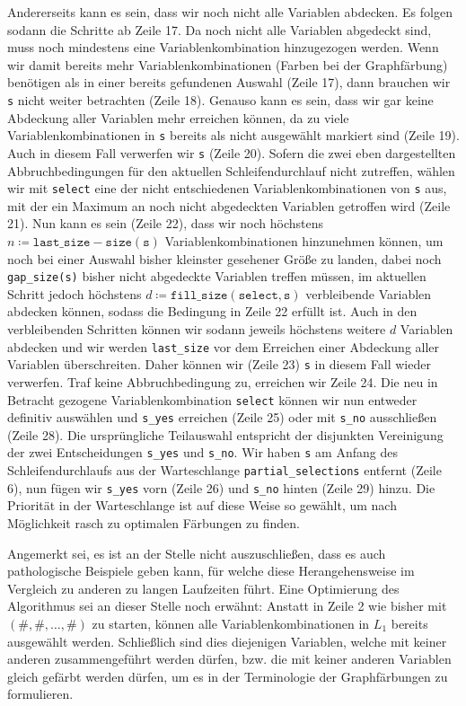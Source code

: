 \documentclass[a4paper]{article}
\theoremstyle{nonumberplain}
\begin{document}
Andererseits kann es sein, dass wir noch nicht alle Variablen abdecken. Es folgen sodann die Schritte ab Zeile 17. Da noch nicht alle Variablen abgedeckt sind, muss noch mindestens eine Variablenkombination hinzugezogen werden. Wenn wir damit bereits mehr Variablenkombinationen (Farben bei der Graph\-fär\-bung) benötigen als in einer bereits gefundenen Auswahl (Zeile 17), dann brauchen wir \texttt{s} nicht weiter betrachten (Zeile 18). Genauso kann es sein, dass wir gar keine Abdeckung aller Variablen mehr erreichen können, da zu viele Variablenkombinationen in \texttt{s} bereits als nicht ausgewählt markiert sind (Zeile 19). Auch in diesem Fall verwerfen wir \texttt{s} (Zeile 20).
Sofern die zwei eben dargestellten Abbruchbedingungen für den aktuellen Schleifendurchlauf nicht zutreffen, wählen wir mit \texttt{select} eine der nicht entschiedenen Variablenkombinationen von \texttt{s} aus, mit der ein Maximum an noch nicht abgedeckten Variablen getroffen wird (Zeile 21).
Nun kann es sein (Zeile 22), dass wir noch höchstens $n \coloneqq \mathtt{last\_size - size(s)}$ Variablenkombinationen hinzunehmen können, um noch bei einer Auswahl bisher kleinster gesehener Größe zu landen, dabei noch \texttt{gap\_size(s)} bisher nicht abgedeckte Variablen treffen müssen, im aktuellen Schritt jedoch höchstens $d \coloneqq \mathtt{fill\_size(select, s)}$ verbleibende Variablen abdecken können, sodass die Bedingung in Zeile 22 erfüllt ist. Auch in den verbleibenden Schritten können wir sodann jeweils höchstens weitere $d$ Variablen abdecken und wir werden \texttt{last\_size} vor dem Erreichen einer Abdeckung aller Variablen überschreiten. Daher können wir (Zeile 23) \texttt{s} in diesem Fall wieder verwerfen.
Traf keine Abbruchbedingung zu, erreichen wir Zeile 24. Die neu in Betracht gezogene Variablenkombination \texttt{select} können wir nun entweder definitiv auswählen und \texttt{s\_yes} erreichen (Zeile 25) oder mit \texttt{s\_no} ausschließen (Zeile 28). Die ursprüngliche Teilauswahl entspricht der disjunkten Vereinigung der zwei Entscheidungen \texttt{s\_yes} und \texttt{s\_no}. Wir haben \texttt{s} am Anfang des Schleifendurchlaufs aus der Warteschlange \texttt{partial\_selections} entfernt (Zeile 6), nun fügen wir \texttt{s\_yes} vorn (Zeile 26) und \texttt{s\_no} hinten (Zeile 29) hinzu. Die Priorität in der Warteschlange ist auf diese Weise so gewählt, um nach Möglichkeit rasch zu optimalen Färbungen zu finden.

Angemerkt sei, es ist an der Stelle nicht auszuschließen, dass es auch pathologische Beispiele geben kann, für welche diese Herangehensweise im Vergleich zu anderen zu langen Laufzeiten führt.
Eine Optimierung des Algorithmus sei an dieser Stelle noch erwähnt: Anstatt in Zeile 2 wie bisher mit $(\#,\#, \dots, \#)$ zu starten, können alle Variablenkombinationen in $L_1$ bereits ausgewählt werden. Schließlich sind dies diejenigen Variablen, welche mit keiner anderen zusammengeführt werden dürfen, bzw. die mit keiner anderen Variablen gleich gefärbt werden dürfen, um es in der Terminologie der Graphfärbungen zu formulieren.
\end{document}
